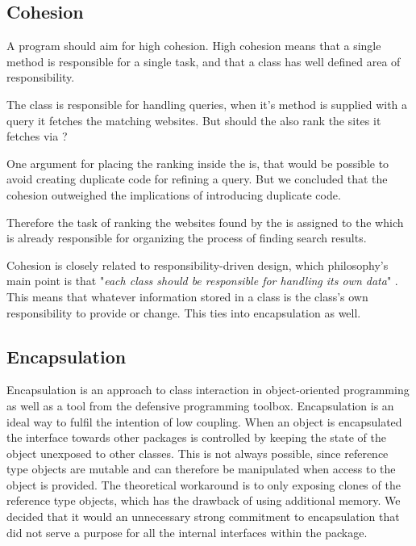 \subsection{Cohesion}
A program should aim for high cohesion. %
High cohesion means that a single method is responsible for a single task, and that a class has well defined area of responsibility. 

The class  is responsible for handling queries, when it's method  is supplied with a query it fetches the matching websites. But should the  also rank the sites it fetches via ? 

One argument for placing the ranking inside the  is, that would be possible to avoid creating duplicate code for refining a query. But we concluded that the cohesion outweighed the implications of introducing duplicate code.

Therefore the task of ranking the websites found by the  is assigned to the   which is already responsible for organizing the process of finding search results.

Cohesion is closely related to responsibility-driven design, which philosophy's main point is that "\textit{each class should be responsible for handling its own data}" \cite[270]{BK}. This means that whatever information stored in a class is the class's own responsibility to provide or change. This ties into encapsulation as well. %

\subsection{Encapsulation}
Encapsulation is an approach to class interaction in object-oriented programming as well as a tool from the defensive programming toolbox. Encapsulation is an ideal way to fulfil the intention of low coupling. When an object is encapsulated the interface towards other packages is controlled by keeping the state of the object unexposed to other classes. This is not always possible, since reference type objects are mutable and can therefore be manipulated when access to the object is provided. The theoretical workaround is to only exposing clones of the reference type objects, which has the drawback of using additional memory. We decided that it would an unnecessary strong commitment to encapsulation that did not serve a purpose for all the internal interfaces within the  package.

